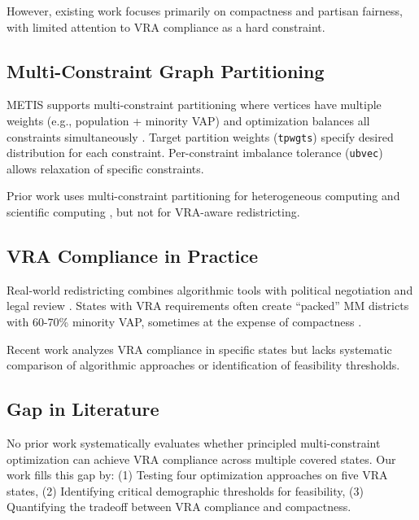 However, existing work focuses primarily on compactness and partisan fairness, with limited attention to VRA compliance as a hard constraint.

\subsection{Multi-Constraint Graph Partitioning}

METIS supports multi-constraint partitioning where vertices have multiple weights (e.g., population + minority VAP) and optimization balances all constraints simultaneously \citep{karypis1998metis}. Target partition weights (\texttt{tpwgts}) specify desired distribution for each constraint. Per-constraint imbalance tolerance (\texttt{ubvec}) allows relaxation of specific constraints.

Prior work uses multi-constraint partitioning for heterogeneous computing \citep{catalyurek2011} and scientific computing \citep{hendrickson2000}, but not for VRA-aware redistricting.

\subsection{VRA Compliance in Practice}

Real-world redistricting combines algorithmic tools with political negotiation and legal review \citep{pildes2002}. States with VRA requirements often create ``packed'' MM districts with 60-70\% minority VAP, sometimes at the expense of compactness \citep{lublin1997}.

Recent work \citep{duchin2020alabama, chen2020texas} analyzes VRA compliance in specific states but lacks systematic comparison of algorithmic approaches or identification of feasibility thresholds.

\subsection{Gap in Literature}

No prior work systematically evaluates whether principled multi-constraint optimization can achieve VRA compliance across multiple covered states. Our work fills this gap by:
(1) Testing four optimization approaches on five VRA states,
(2) Identifying critical demographic thresholds for feasibility,
(3) Quantifying the tradeoff between VRA compliance and compactness.
